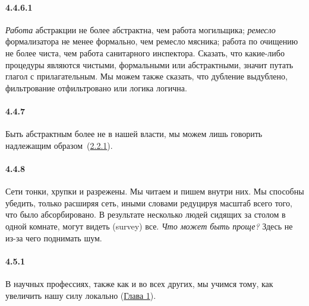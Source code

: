 \paragraph{4.4.6.1}\hypertarget{par:4.4.6.1}{} {\itshape Работа} абстракции не более абстрактна, чем работа могильщика; {\itshape ремесло} формализатора не менее формально, чем ремесло мясника; работа по очищению не более чиста, чем работа санитарного инспектора. Сказать, что какие-либо процедуры являются чистыми, формальными или абстрактными, значит путать глагол с прилагательным. Мы можем также сказать, что дубление выдублено, фильтрование отфильтровано или логика логична.


\paragraph{4.4.7}\hypertarget{par:4.4.7}{} Быть абстрактным более не в нашей власти, мы можем лишь говорить надлежащим образом~(\hyperlink{par:2.2.1}{2.2.1}).


\paragraph{4.4.8}\hypertarget{par:4.4.8}{} Сети тонки, хрупки и разрежены. Мы читаем и пишем внутри них. Мы способны убедить, только расширяя сеть, иными словами редуцируя масштаб всего того, что было абсорбировано. В результате несколько людей сидящих за столом в одной комнате, могут видеть (survey) все. {\itshape Что может быть проще? }Здесь не из-за чего поднимать шум. 


\paragraph{4.5.1}\hypertarget{par:4.5.1}{} В научных профессиях, также как и во всех других, мы учимся тому, как увеличить нашу силу локально (\hyperlink{chap1}{Глава 1}).


